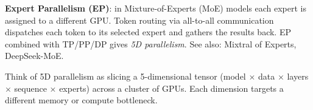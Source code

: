 \textbf{Expert Parallelism (EP)}: in Mixture-of-Experts (MoE) models each expert is
assigned to a different GPU. Token routing via all-to-all communication dispatches each
token to its selected expert and gathers the results back. EP combined with TP/PP/DP
gives \emph{5D parallelism}. See also: Mixtral of Experts, DeepSeek-MoE.

\begin{intuitionbox}
  Think of 5D parallelism as slicing a 5-dimensional tensor (model $\times$ data $\times$
  layers $\times$ sequence $\times$ experts) across a cluster of GPUs. Each dimension
  targets a different memory or compute bottleneck.
\end{intuitionbox}
